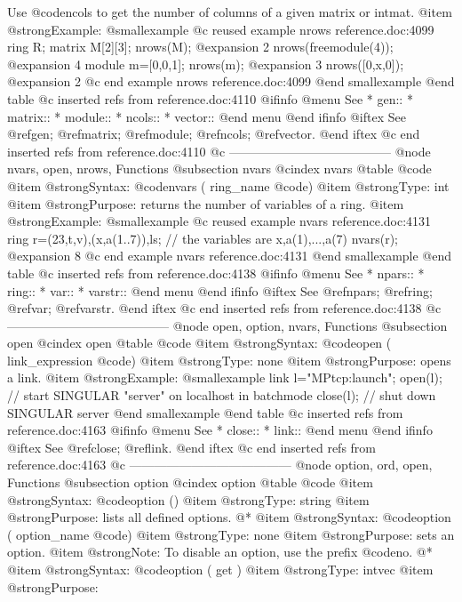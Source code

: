 {Use @code{ncols} to get the number of columns of a given matrix or intmat.
@item @strong{Example:}
@smallexample
@c reused example nrows reference.doc:4099 
  ring R;
  matrix M[2][3];
  nrows(M);
@expansion{} 2
  nrows(freemodule(4));
@expansion{} 4
  module m=[0,0,1];
  nrows(m);
@expansion{} 3
  nrows([0,x,0]);
@expansion{} 2
@c end example nrows reference.doc:4099
@end smallexample
@end table
@c inserted refs from reference.doc:4110
@ifinfo
@menu
See
* gen::
* matrix::
* module::
* ncols::
* vector::
@end menu
@end ifinfo
@iftex
See
@ref{gen};
@ref{matrix};
@ref{module};
@ref{ncols};
@ref{vector}.
@end iftex
@c end inserted refs from reference.doc:4110
@c ---------------------------------------
@node nvars, open, nrows, Functions
@subsection nvars
@cindex nvars
@table @code
@item @strong{Syntax:}
@code{nvars (} ring_name @code{)}
@item @strong{Type:}
int
@item @strong{Purpose:}
returns the number of variables of a ring.
@item @strong{Example:}
@smallexample
@c reused example nvars reference.doc:4131 
  ring r=(23,t,v),(x,a(1..7)),ls;
  // the variables are x,a(1),...,a(7)
  nvars(r);
@expansion{} 8
@c end example nvars reference.doc:4131
@end smallexample
@end table
@c inserted refs from reference.doc:4138
@ifinfo
@menu
See
* npars::
* ring::
* var::
* varstr::
@end menu
@end ifinfo
@iftex
See
@ref{npars};
@ref{ring};
@ref{var};
@ref{varstr}.
@end iftex
@c end inserted refs from reference.doc:4138
@c ---------------------------------------
@node open, option, nvars, Functions
@subsection open
@cindex open
@table @code
@item @strong{Syntax:}
@code{open (} link_expression @code{)}
@item @strong{Type:}
none
@item @strong{Purpose:}
opens a link.
@item @strong{Example:}
@smallexample
link l="MPtcp:launch";
open(l);  // start SINGULAR "server" on localhost in batchmode
close(l); // shut down SINGULAR server
@end smallexample
@end table
@c inserted refs from reference.doc:4163
@ifinfo
@menu
See
* close::
* link::
@end menu
@end ifinfo
@iftex
See
@ref{close};
@ref{link}.
@end iftex
@c end inserted refs from reference.doc:4163
@c ---------------------------------------
@node option, ord, open, Functions
@subsection option
@cindex option
@table @code
@item @strong{Syntax:}
@code{option ()}
@item @strong{Type:}
string
@item @strong{Purpose:}
lists all defined options.
@*
@item @strong{Syntax:}
@code{option (} option_name @code{)}
@item @strong{Type:}
none
@item @strong{Purpose:}
sets an option.
@item @strong{Note:}
To disable an option, use the prefix @code{no}.
@*
@item @strong{Syntax:}
@code{option ( get )}
@item @strong{Type:}
intvec
@item @strong{Purpose:}
}
